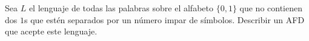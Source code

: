 \begin{ejercicio} \label{ej:1.2.9}
    Sea $L$ el lenguaje de todas las palabras sobre el alfabeto $\{0, 1\}$ que no contienen dos $1$s que estén separados por un número impar de símbolos. Describir un AFD que acepte este lenguaje.


    \begin{comment}
    Veamos qué estados hay:
    \begin{itemize}
        \item $q_0$: No se ha introducido ningún $1$.
        \item $q_1$: Se ha introducido un $1$. El número de símbolos después del $1$ es par, por lo que dejo meter otro $0$ o un $1$.
        \item $q_2$: El número de símbolos después del $1$ es impar, por lo que solo puedo meter un $0$.
    \end{itemize}

    El autómata obtenido es el de la Figura \ref{fig:ej:1.2.9}.
    \begin{figure}
        \centering
        \begin{tikzpicture}
            \node[state, initial] (q0) {$q_0$};
            \node[state, above right of=q0] (q1) {$q_1$};
            \node[state, below right of=q0] (q2) {$q_2$};

            \draw   (q0) edge[above] node{0} (q1)
                    (q0) edge[below] node{1} (q2);
        \end{tikzpicture}
        \caption{Autómata Finito Determinista del Ejercicio \ref{ej:1.2.9}}
        \label{fig:ej:1.2.9}
    \end{figure}
    \end{comment}
\end{ejercicio}


